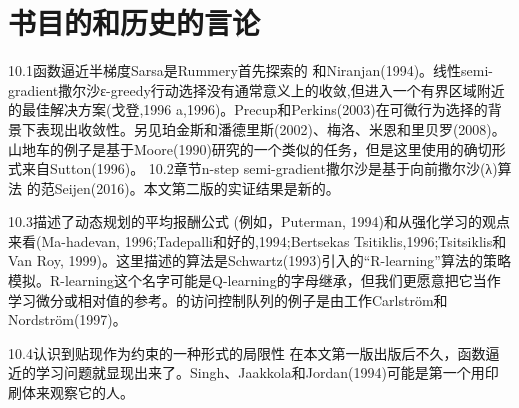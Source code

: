 \section{书目的和历史的言论}

10.1函数逼近半梯度Sarsa是Rummery首先探索的
和Niranjan(1994)。线性semi-gradient撒尔沙ε-greedy行动选择没有通常意义上的收敛,但进入一个有界区域附近的最佳解决方案(戈登,1996 a,1996)。Precup和Perkins(2003)在可微行为选择的背景下表现出收敛性。另见珀金斯和潘德里斯(2002)、梅洛、米恩和里贝罗(2008)。山地车的例子是基于Moore(1990)研究的一个类似的任务，但是这里使用的确切形式来自Sutton(1996)。
10.2章节n-step semi-gradient撒尔沙是基于向前撒尔沙(λ)算法
的范Seijen(2016)。本文第二版的实证结果是新的。

10.3描述了动态规划的平均报酬公式
(例如，Puterman, 1994)和从强化学习的观点来看(Ma-hadevan, 1996;Tadepalli和好的,1994;Bertsekas Tsitiklis,1996;Tsitsiklis和Van Roy, 1999)。这里描述的算法是Schwartz(1993)引入的“R-learning”算法的策略模拟。R-learning这个名字可能是Q-learning的字母继承，但我们更愿意把它当作学习微分或相对值的参考。的访问控制队列的例子是由工作Carlström和Nordström(1997)。

10.4认识到贴现作为约束的一种形式的局限性
在本文第一版出版后不久，函数逼近的学习问题就显现出来了。Singh、Jaakkola和Jordan(1994)可能是第一个用印刷体来观察它的人。
